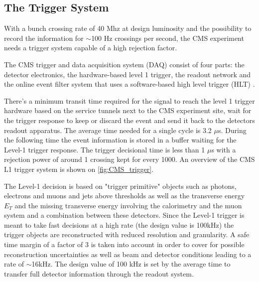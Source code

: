 \clearpage

\subsection{The Trigger System}

With a bunch crossing rate of 40 Mhz at design luminosity and the possibility to record the information for $\sim$100 Hz crossings per second, the CMS experiment needs a trigger system capable of a high rejection factor.

The CMS trigger and data acquisition system (DAQ) consist of four parts: the detector electronics, the hardware-based level 1 trigger, the readout network and the online event filter system that uses a software-based high level trigger (HLT) \cite{bib:cmstdr:trigger}.

There's a minimum transit time required for the signal to reach the level 1 trigger hardware based on the service tunnels next to the CMS experiment site, wait for the trigger response to keep or discard the event and send it back to the detectors readout apparatus. The average time needed for a single cycle is 3.2 $\mu$s. During the following time the event information is stored in a buffer waiting for the Level-1 trigger response. The trigger decisional time is less than 1 $\mu$s with a rejection power of around 1 crossing kept for every 1000. An overview of the CMS L1 trigger system is shown on \autoref{fig:CMS_trigger}.

The Level-1 decision is based on "trigger primitive" objects such as photons, electrons and muons and jets above thresholds as well as the transverse energy $E_{T}$ and the missing transverse energy \met involving the calorimetry and the muon system and a combination between these detectors. Since the Level-1 trigger is meant to take fast decisions at a high rate (the design value is 100kHz) the trigger objects are reconstructed with reduced resolution and granularity. A safe time margin of a factor of 3 is taken into account in order to cover for possible reconstruction uncertainties as well as beam and detector conditions leading to a rate of $\sim$16kHz. The design value of 100 kHz is set by the average time to transfer full detector information through the readout system.

